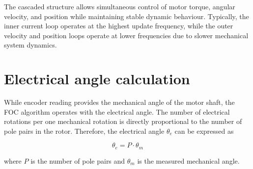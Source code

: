 The cascaded structure allows simultaneous control of motor torque, angular velocity, and position while maintaining stable dynamic behaviour.
Typically, the inner current loop operates at the highest update frequency, while the outer velocity and position loops operate at lower frequencies
due to slower mechanical system dynamics.

\section{Electrical angle calculation}
While encoder reading provides the mechanical angle of the motor shaft, the FOC algorithm operates with the electrical angle.
The number of electrical rotations per one mechanical rotation is directly proportional to the number of pole pairs in the rotor.
Therefore, the electrical angle $\theta_e$ can be expressed as

\begin{equation}
    \theta_e = P \cdot \theta_m
\end{equation}

where $P$ is the number of pole pairs and $\theta_m$ is the measured mechanical angle. \cite{electrical_offset}
